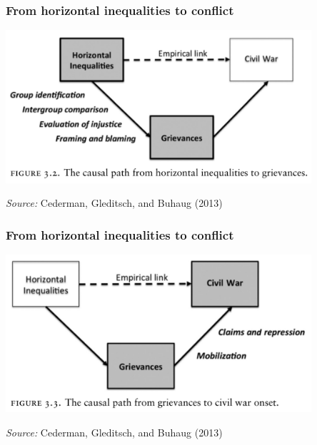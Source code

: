 \documentclass[aspectratio=43]{beamer}
\begin{document}
\begin{frame}
\frametitle{From horizontal inequalities to conflict}
\centering

\includegraphics[width = 0.85\textwidth]{img/cgb_causal1}

\vspace{15pt}

{\small \textit{Source:} Cederman, Gleditsch, and Buhaug (2013)}

\end{frame}

\begin{frame}
\frametitle{From horizontal inequalities to conflict}
\centering

\includegraphics[width = 0.85\textwidth]{img/cgb_causal2}

\vspace{15pt}

{\small \textit{Source:} Cederman, Gleditsch, and Buhaug (2013)}

\end{frame}
\end{document}
